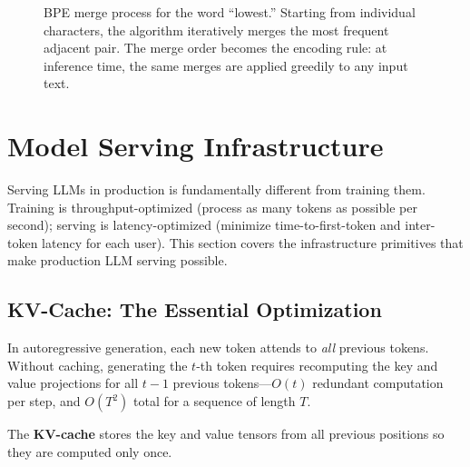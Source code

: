 \begin{figure}[H]
\caption{BPE merge process for the word ``lowest.''  Starting from individual characters,
the algorithm iteratively merges the most frequent adjacent pair.  The merge order
becomes the encoding rule: at inference time, the same merges are applied greedily
to any input text.}
\label{fig:bpe_merge}
\end{figure}


\section{Model Serving Infrastructure}
\label{sec:model_serving}

Serving LLMs in production is fundamentally different from training them.  Training is
throughput-optimized (process as many tokens as possible per second); serving is
latency-optimized (minimize time-to-first-token and inter-token latency for each user).
This section covers the infrastructure primitives that make production LLM serving possible.

\subsection{KV-Cache: The Essential Optimization}
\label{sec:kv_cache}

In autoregressive generation, each new token attends to \emph{all} previous tokens.
Without caching, generating the $t$-th token requires recomputing the key and value
projections for all $t-1$ previous tokens---$O(t)$ redundant computation per step,
and $O(T^2)$ total for a sequence of length $T$.

The \textbf{KV-cache} stores the key and value tensors from all previous positions so
they are computed only once.

